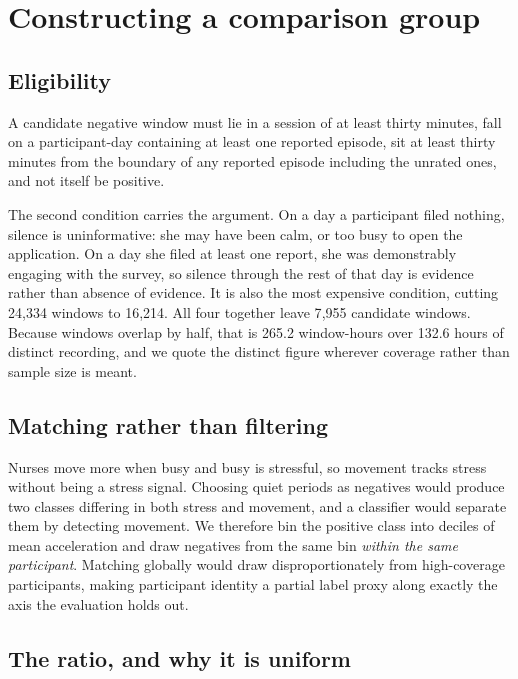 \documentclass{article}
\begin{document}
\section{Constructing a comparison group}
\label{sec:negatives}

\subsection{Eligibility}

A candidate negative window must lie in a session of at least thirty minutes,
fall on a participant-day containing at least one reported episode, sit at
least thirty minutes from the boundary of any reported episode including the
unrated ones, and not itself be positive.

The second condition carries the argument. On a day a participant filed
nothing, silence is uninformative: she may have been calm, or too busy to open
the application. On a day she filed at least one report, she was demonstrably
engaging with the survey, so silence through the rest of that day is evidence
rather than absence of evidence. It is also the most expensive condition,
cutting 24{,}334 windows to 16{,}214. All four together leave 7{,}955 candidate
windows. Because windows overlap by half, that is 265.2 window-hours over 132.6
hours of distinct recording, and we quote the distinct figure wherever coverage
rather than sample size is meant.

\subsection{Matching rather than filtering}

Nurses move more when busy and busy is stressful, so movement tracks stress
without being a stress signal. Choosing quiet periods as negatives would
produce two classes differing in both stress and movement, and a classifier
would separate them by detecting movement. We therefore bin the positive class
into deciles of mean acceleration and draw negatives from the same bin
\emph{within the same participant}. Matching globally would draw
disproportionately from high-coverage participants, making participant identity
a partial label proxy along exactly the axis the evaluation holds out.

\subsection{The ratio, and why it is uniform}
\end{document}
